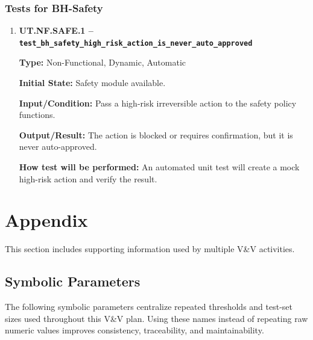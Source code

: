 \documentclass[12pt, titlepage]{article}
\begin{document}
\subsubsection{Tests for BH-Safety}

\begin{enumerate}

\item \textbf{UT.NF.SAFE.1 --
\texttt{test\_bh\_safety\_high\_risk\_action\_is\_never\_auto\_approved}}

\textbf{Type:} Non-Functional, Dynamic, Automatic

\textbf{Initial State:} Safety module available.

\textbf{Input/Condition:} Pass a high-risk irreversible action to the safety
policy functions.

\textbf{Output/Result:} The action is blocked or requires confirmation, but it
is never auto-approved.

\textbf{How test will be performed:} An automated unit test will create a mock
high-risk action and verify the result.

\end{enumerate}

\FloatBarrier





\newpage

\section{Appendix}

This section includes supporting information used by multiple V\&V
activities.

\subsection{Symbolic Parameters}

The following symbolic parameters centralize repeated thresholds and test-set
sizes used throughout this V\&V plan. Using these names instead of repeating
raw numeric values improves consistency, traceability, and maintainability.
\end{document}
